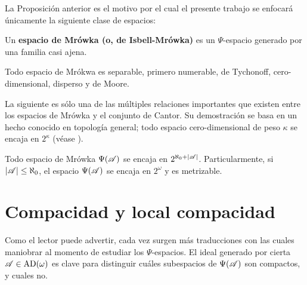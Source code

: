  La Proposición anterior es el motivo por el cual el presente trabajo se enfocará únicamente la siguiente clase de espacios:

 \begin{definicion}
  Un \textbf{espacio de Mrówka (o, de Isbell-Mrówka)} es un $\Psi$-espacio generado por una familia casi ajena.
 \end{definicion}

 \begin{corolario}\label{cor-MrwokaSiempre}
  Todo espacio de Mrókwa es separable, primero numerable, de Tychonoff, cero-dimensional, disperso y de Moore.
 \end{corolario}

 La siguiente es sólo una de las múltiples relaciones importantes que existen entre los espacios de Mrówka y el conjunto de Cantor. Su demostración se basa en un hecho conocido en topología general; todo espacio cero-dimensional de peso $\kappa$ se encaja en $2^\kappa$ (véase \cite[Teo.~8.5.11, p.~299]{fidelElementos}).

 \begin{corolario}\label{cor-EncajeMrowkaCantor}
  Todo espacio de Mrówka $\Psi(\mathscr{A})$ se encaja en $2^{\aleph_0+|\mathscr{A}|}$. Particularmente, si $|\mathscr{A}|\leq \aleph_0$, el espacio $\Psi(\mathscr{A})$ se encaja en $2^\omega$ y es metrizable.
 \end{corolario}

 \section{Compacidad y local compacidad}

 Como el lector puede advertir, cada vez surgen más traducciones con las cuales maniobrar al momento de estudiar los $\Psi$-espacios. El ideal generado por cierta $\mathscr{A} \in \operatorname{AD}(\omega)$ es clave para distinguir cuáles subespacios de $\Psi(\mathscr{A})$ son compactos, y cuales no. 
 
